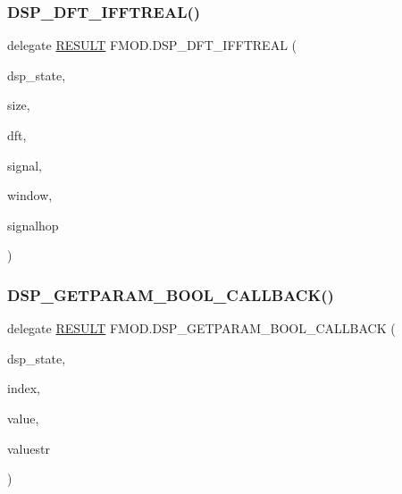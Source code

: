\mbox{\label{namespace_f_m_o_d_acff7f43ee3fdbeba059b99619bb9f8f5}} 
\subsubsection{\texorpdfstring{D\+S\+P\+\_\+\+D\+F\+T\+\_\+\+I\+F\+F\+T\+R\+E\+A\+L()}{DSP\_DFT\_IFFTREAL()}}
{\footnotesize\ttfamily delegate \hyperlink{namespace_f_m_o_d_a305d1176ef3f8c8815861a60407ac33d}{R\+E\+S\+U\+LT} F\+M\+O\+D.\+D\+S\+P\+\_\+\+D\+F\+T\+\_\+\+I\+F\+F\+T\+R\+E\+AL (\begin{DoxyParamCaption}\item[{ref \hyperlink{struct_f_m_o_d_1_1_d_s_p___s_t_a_t_e}{D\+S\+P\+\_\+\+S\+T\+A\+TE}}]{dsp\+\_\+state,  }\item[{int}]{size,  }\item[{Int\+Ptr}]{dft,  }\item[{Int\+Ptr}]{signal,  }\item[{Int\+Ptr}]{window,  }\item[{int}]{signalhop }\end{DoxyParamCaption})}

\mbox{\label{namespace_f_m_o_d_a33838e3f6ccd4391d489471a6c8f6759}} 
\subsubsection{\texorpdfstring{D\+S\+P\+\_\+\+G\+E\+T\+P\+A\+R\+A\+M\+\_\+\+B\+O\+O\+L\+\_\+\+C\+A\+L\+L\+B\+A\+C\+K()}{DSP\_GETPARAM\_BOOL\_CALLBACK()}}
{\footnotesize\ttfamily delegate \hyperlink{namespace_f_m_o_d_a305d1176ef3f8c8815861a60407ac33d}{R\+E\+S\+U\+LT} F\+M\+O\+D.\+D\+S\+P\+\_\+\+G\+E\+T\+P\+A\+R\+A\+M\+\_\+\+B\+O\+O\+L\+\_\+\+C\+A\+L\+L\+B\+A\+CK (\begin{DoxyParamCaption}\item[{ref \hyperlink{struct_f_m_o_d_1_1_d_s_p___s_t_a_t_e}{D\+S\+P\+\_\+\+S\+T\+A\+TE}}]{dsp\+\_\+state,  }\item[{int}]{index,  }\item[{ref bool}]{value,  }\item[{Int\+Ptr}]{valuestr }\end{DoxyParamCaption})}


